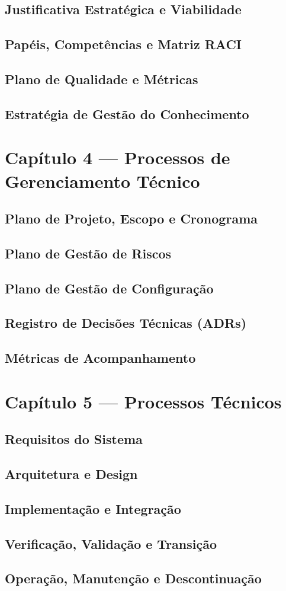 \documentclass[12pt,a4paper]{article}
\begin{document}
\subsection{Justificativa Estratégica e Viabilidade}
\subsection{Papéis, Competências e Matriz RACI}
\subsection{Plano de Qualidade e Métricas}
\subsection{Estratégia de Gestão do Conhecimento}

\section{Capítulo 4 --- Processos de Gerenciamento Técnico}
\subsection{Plano de Projeto, Escopo e Cronograma}
\subsection{Plano de Gestão de Riscos}
\subsection{Plano de Gestão de Configuração}
\subsection{Registro de Decisões Técnicas (ADRs)}
\subsection{Métricas de Acompanhamento}

\section{Capítulo 5 --- Processos Técnicos}
\subsection{Requisitos do Sistema}
\subsection{Arquitetura e Design}
\subsection{Implementação e Integração}
\subsection{Verificação, Validação e Transição}
\subsection{Operação, Manutenção e Descontinuação}
\end{document}
